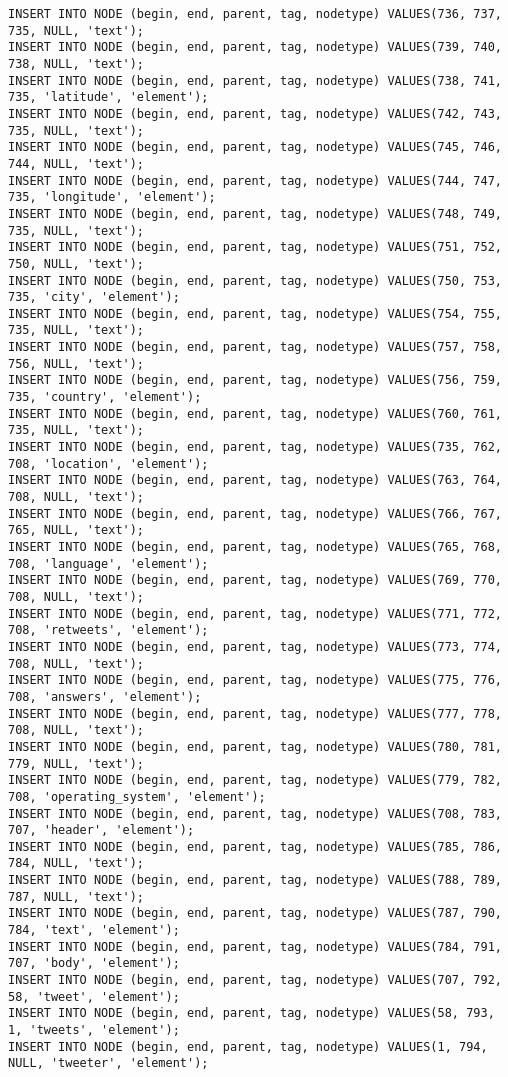 \begin{verbatim}
INSERT INTO NODE (begin, end, parent, tag, nodetype) VALUES(736, 737, 735, NULL, 'text');
INSERT INTO NODE (begin, end, parent, tag, nodetype) VALUES(739, 740, 738, NULL, 'text');
INSERT INTO NODE (begin, end, parent, tag, nodetype) VALUES(738, 741, 735, 'latitude', 'element');
INSERT INTO NODE (begin, end, parent, tag, nodetype) VALUES(742, 743, 735, NULL, 'text');
INSERT INTO NODE (begin, end, parent, tag, nodetype) VALUES(745, 746, 744, NULL, 'text');
INSERT INTO NODE (begin, end, parent, tag, nodetype) VALUES(744, 747, 735, 'longitude', 'element');
INSERT INTO NODE (begin, end, parent, tag, nodetype) VALUES(748, 749, 735, NULL, 'text');
INSERT INTO NODE (begin, end, parent, tag, nodetype) VALUES(751, 752, 750, NULL, 'text');
INSERT INTO NODE (begin, end, parent, tag, nodetype) VALUES(750, 753, 735, 'city', 'element');
INSERT INTO NODE (begin, end, parent, tag, nodetype) VALUES(754, 755, 735, NULL, 'text');
INSERT INTO NODE (begin, end, parent, tag, nodetype) VALUES(757, 758, 756, NULL, 'text');
INSERT INTO NODE (begin, end, parent, tag, nodetype) VALUES(756, 759, 735, 'country', 'element');
INSERT INTO NODE (begin, end, parent, tag, nodetype) VALUES(760, 761, 735, NULL, 'text');
INSERT INTO NODE (begin, end, parent, tag, nodetype) VALUES(735, 762, 708, 'location', 'element');
INSERT INTO NODE (begin, end, parent, tag, nodetype) VALUES(763, 764, 708, NULL, 'text');
INSERT INTO NODE (begin, end, parent, tag, nodetype) VALUES(766, 767, 765, NULL, 'text');
INSERT INTO NODE (begin, end, parent, tag, nodetype) VALUES(765, 768, 708, 'language', 'element');
INSERT INTO NODE (begin, end, parent, tag, nodetype) VALUES(769, 770, 708, NULL, 'text');
INSERT INTO NODE (begin, end, parent, tag, nodetype) VALUES(771, 772, 708, 'retweets', 'element');
INSERT INTO NODE (begin, end, parent, tag, nodetype) VALUES(773, 774, 708, NULL, 'text');
INSERT INTO NODE (begin, end, parent, tag, nodetype) VALUES(775, 776, 708, 'answers', 'element');
INSERT INTO NODE (begin, end, parent, tag, nodetype) VALUES(777, 778, 708, NULL, 'text');
INSERT INTO NODE (begin, end, parent, tag, nodetype) VALUES(780, 781, 779, NULL, 'text');
INSERT INTO NODE (begin, end, parent, tag, nodetype) VALUES(779, 782, 708, 'operating_system', 'element');
INSERT INTO NODE (begin, end, parent, tag, nodetype) VALUES(708, 783, 707, 'header', 'element');
INSERT INTO NODE (begin, end, parent, tag, nodetype) VALUES(785, 786, 784, NULL, 'text');
INSERT INTO NODE (begin, end, parent, tag, nodetype) VALUES(788, 789, 787, NULL, 'text');
INSERT INTO NODE (begin, end, parent, tag, nodetype) VALUES(787, 790, 784, 'text', 'element');
INSERT INTO NODE (begin, end, parent, tag, nodetype) VALUES(784, 791, 707, 'body', 'element');
INSERT INTO NODE (begin, end, parent, tag, nodetype) VALUES(707, 792, 58, 'tweet', 'element');
INSERT INTO NODE (begin, end, parent, tag, nodetype) VALUES(58, 793, 1, 'tweets', 'element');
INSERT INTO NODE (begin, end, parent, tag, nodetype) VALUES(1, 794, NULL, 'tweeter', 'element');
\end{verbatim}

